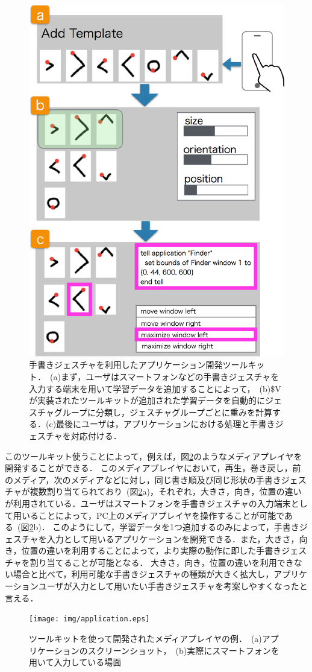 \begin{figure} [h!]
	\begin{center}
		\includegraphics [width=0.7\hsize ]{img/flow.eps}
	\end{center}
	\caption{手書きジェスチャを利用したアプリケーション開発ツールキット．~(a)まず，ユーザはスマートフォンなどの手書きジェスチャを入力する端末を用いて学習データを追加することによって，~(b)\$Vが実装されたツールキットが追加された学習データを自動的にジェスチャグループに分類し，ジェスチャグループごとに重みを計算する．(c)最後にユーザは，アプリケーションにおける処理と手書きジェスチャを対応付ける．}
	\label{fig:flow}
\end{figure}

このツールキット使うことによって，例えば，図\ref{fig:application}のようなメディアプレイヤを開発することができる．
このメディアプレイヤにおいて，再生，巻き戻し，前のメディア，次のメディアなどに対し，同じ書き順及び同じ形状の手書きジェスチャが複数割り当てられており~(図\ref{fig:application}a)，それぞれ，大きさ，向き，位置の違いが利用されている．ユーザはスマートフォンを手書きジェスチャの入力端末として用いることによって，PC上のメディアプレイヤを操作することが可能である~(図\ref{fig:application}b)．
このようにして，学習データを1つ追加するのみによって，手書きジェスチャを入力として用いるアプリケーションを開発できる．また，大きさ，向き，位置の違いを利用することによって，より実際の動作に即した手書きジェスチャを割り当てることが可能となる．
大きさ，向き，位置の違いを利用できない場合と比べて，利用可能な手書きジェスチャの種類が大きく拡大し，アプリケーションユーザが入力として用いたい手書きジェスチャを考案しやすくなったと言える．

\begin{figure} [h!]
	\begin{center}
		\texttt{[image: img/application.eps]}
	\end{center}
	\caption{ツールキットを使って開発されたメディアプレイヤの例．~(a)アプリケーションのスクリーンショット，~(b)実際にスマートフォンを用いて入力している場面}
	\label{fig:application}
\end{figure}
